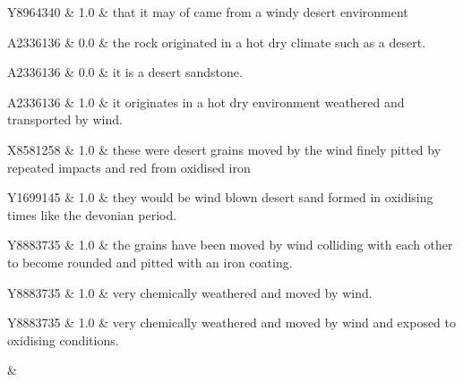 Y8964340 & 1.0 & that it may of came from a windy desert environment 
 \\ 

A2336136 & 0.0 & the rock originated in a hot dry climate such as a desert. 
 \\ 

A2336136 & 0.0 & it is a desert sandstone. 
 \\ 

A2336136 & 1.0 & it originates in a hot dry environment weathered and transported by wind. 
 \\ 

X8581258 & 1.0 & these were desert grains moved by the wind finely pitted by repeated impacts and red from oxidised iron 
 \\ 

Y1699145 & 1.0 & they would be wind blown desert sand formed in oxidising times like the devonian period. 
 \\ 

Y8883735 & 1.0 & the grains have been moved by wind colliding with each other to become rounded and pitted with an iron coating. 
 \\ 

Y8883735 & 1.0 & very chemically weathered and moved by wind. 
 \\ 

Y8883735 & 1.0 & very chemically weathered and moved by wind and exposed to oxidising conditions. 
 \\ 

 &  \\